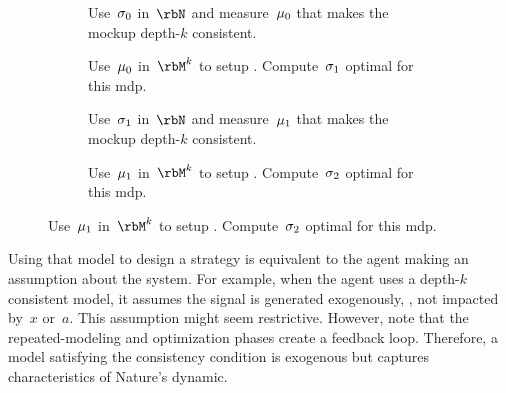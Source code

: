 \begin{figure}[pht]
\begin{subfigure}[b]{0.5\textwidth}
\centering
{
  \renewcommand{\sigmaparameter}{0}
  \renewcommand{\muparameter}{0}
}
\caption{Use~\(\sigma_{0}\) in~\(\rbN\) and measure~\(\mu_{0}\) that makes the mockup depth-\(k\) consistent.}
\end{subfigure}%
\begin{subfigure}[b]{0.5\textwidth}
\centering
{
  \renewcommand{\sigmaparameter}{1}
  \renewcommand{\muparameter}{0}
}
\caption{Use~\(\mu_{0}\) in~\(\rbM\K\) to setup .
Compute~\(\sigma_{1}\) optimal for this \ac{mdp}.}
\end{subfigure}

\vspace{40pt}

\begin{subfigure}[b]{0.5\textwidth}
\centering
{
  \renewcommand{\sigmaparameter}{1}
  \renewcommand{\muparameter}{1}
}
\caption{Use~\(\sigma_{1}\) in~\(\rbN\) and measure~\(\mu_{1}\) that makes the mockup depth-\(k\) consistent.}
\end{subfigure}%
\begin{subfigure}[b]{0.5\textwidth}
\centering
{
  \renewcommand{\sigmaparameter}{2}
  \renewcommand{\muparameter}{1}
}
\caption{Use~\(\mu_{1}\) in~\(\rbM\K\) to setup .
Compute~\(\sigma_{2}\) optimal for this \ac{mdp}.}
\end{subfigure}
\vspace{40pt}
\label{fig:iterative_process}
\end{figure}

Using that model to design a strategy is equivalent to the agent making an assumption about the system.
For example, when the agent uses a depth-\(k\) consistent model, it assumes the signal is generated exogenously, \ie, not impacted by~\(x\) or~\(a\).
This assumption might seem restrictive.
However, note that the repeated-modeling and optimization phases create a feedback loop.
Therefore, a model satisfying the consistency condition is exogenous but captures characteristics of Nature's dynamic.

